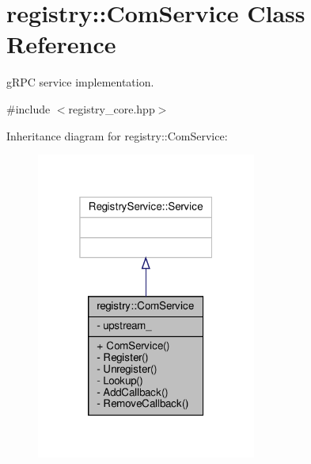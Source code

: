 \hypertarget{classregistry_1_1ComService}{}\section{registry\+:\+:Com\+Service Class Reference}
\label{classregistry_1_1ComService}


g\+R\+PC service implementation.  




{\ttfamily \#include $<$registry\+\_\+core.\+hpp$>$}



Inheritance diagram for registry\+:\+:Com\+Service\+:\nopagebreak
\begin{figure}[H]
\begin{center}
\leavevmode
\includegraphics[width=205pt]{classregistry_1_1ComService__inherit__graph}
\end{center}
\end{figure}


